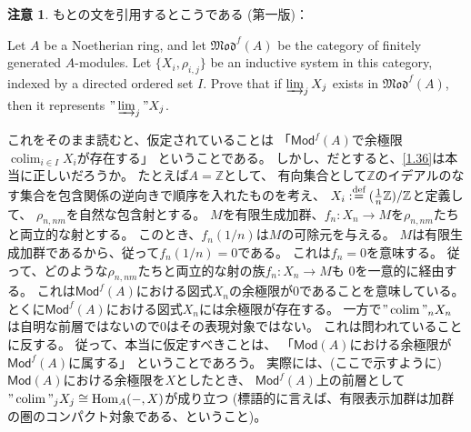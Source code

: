 \documentclass[uplatex,dvipdfmx]{jsarticle}
\theoremstyle{definition}
\newtheorem*{rem*}{注意}
\DeclareMathOperator{\Hom}{\mathrm{Hom}}
\DeclareMathOperator{\colim}{\mathrm{colim}}
\newcommand{\Mod}{\mathsf{Mod}}
\newcommand\Z{\mathbb{Z}}
\def\dfn{:\overset{\mbox{{\scriptsize def}}}{=}}
\begin{document}
\begin{rem*}
  もとの文を引用するとこうである (第一版)：

  Let \(A\) be a Noetherian ring, and
  let \(\mathfrak{Mod}^f(A)\) be the category of finitely generated \(A\)-modules.
  Let \(\{X_i,\rho_{i,j}\}\) be an inductive system in this category,
  indexed by a directed ordered set \(I\).
  Prove that if \(\varinjlim_{j} X_j\) exists in \(\mathfrak{Mod}^f(A)\),
  then it represents \("\varinjlim_j" X_j\).

  これをそのまま読むと、仮定されていることは
  「\(\Mod^f(A)\)で余極限\(\colim_{i\in I}X_i\)が存在する」
  ということである。
  しかし、だとすると、\autoref{1.36}は本当に正しいだろうか。
  たとえば\(A=\Z\)として、
  有向集合として\(\Z\)のイデアルのなす集合を包含関係の逆向きで順序を入れたものを考え、
  \(X_i\dfn (\frac{1}{n}\Z)/\Z\)と定義して、
  \(\rho_{n,nm}\)を自然な包含射とする。
  \(M\)を有限生成加群、\(f_n:X_n\to M\)を\(\rho_{n,nm}\)たちと両立的な射とする。
  このとき、\(f_n(1/n)\)は\(M\)の可除元を与える。
  \(M\)は有限生成加群であるから、従って\(f_n(1/n)=0\)である。
  これは\(f_n=0\)を意味する。
  従って、どのような\(\rho_{n,nm}\)たちと両立的な射の族\(f_n:X_n\to M\)も
  \(0\)を一意的に経由する。
  これは\(\Mod^f(A)\)における図式\(X_n\)の余極限が\(0\)であることを意味している。
  とくに\(\Mod^f(A)\)における図式\(X_n\)には余極限が存在する。
  一方で\("\colim"_n X_n\)は自明な前層ではないので\(0\)はその表現対象ではない。
  これは問われていることに反する。
  従って、本当に仮定すべきことは、
  「\(\Mod(A)\)における余極限が\(\Mod^f(A)\)に属する」
  ということであろう。
  実際には、(ここで示すように)
  \(\Mod(A)\)における余極限を\(X\)としたとき、
  \(\Mod^f(A)\)上の前層として
  \("\colim"_j X_j \cong \Hom_A(-,X)\)が成り立つ
  (標語的に言えば、有限表示加群は加群の圏のコンパクト対象である、ということ)。
\end{rem*}
\end{document}

